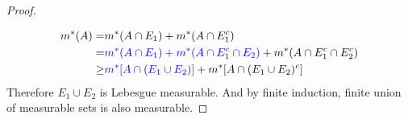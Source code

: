 \begin{enumerate}
\begin{proof}
\begin{center}
\end{center}
	\begin{align*}
		m^\ast(A) = & m^\ast(A \cap E_1) + m^\ast(A \cap E_1^c) \\
		= & {\color{blue}m^\ast(A \cap E_1) + m^\ast(A \cap E_1^c \cap E_2)} + m^\ast(A \cap E_1^c \cap E_2^c) \\
		\ge & {\color{blue}m^\ast[A \cap (E_1 \cup E_2)]} + m^\ast[A \cap (E_1 \cup E_2)^c] 
	\end{align*}
	Therefore $E_1 \cup E_2$ is Lebesgue measurable.
		And by finite induction, finite union of measurable sets is also measurable.
	\end{proof}


\end{enumerate}
